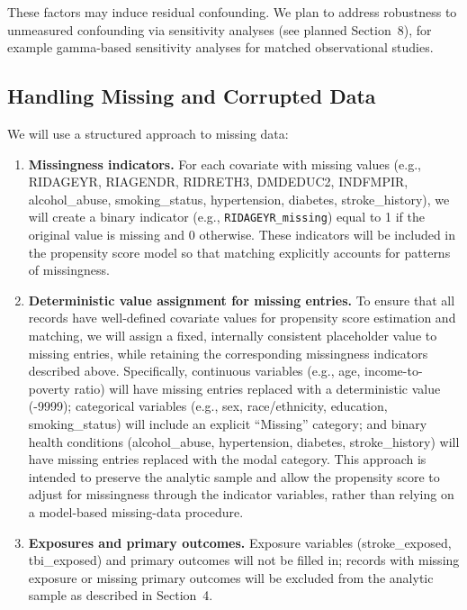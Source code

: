 \documentclass{article}
\begin{document}
These factors may induce residual confounding. We plan to address robustness to unmeasured confounding via sensitivity analyses (see planned Section~8), for example gamma-based sensitivity analyses for matched observational studies.

\subsection{Handling Missing and Corrupted Data}

We will use a structured approach to missing data:

\begin{enumerate}
    \item \textbf{Missingness indicators.} For each covariate with missing values (e.g., RIDAGEYR, RIAGENDR, RIDRETH3, DMDEDUC2, INDFMPIR, alcohol\_abuse, smoking\_status, hypertension, diabetes, stroke\_history), we will create a binary indicator (e.g., \texttt{RIDAGEYR\_missing}) equal to 1 if the original value is missing and 0 otherwise. These indicators will be included in the propensity score model so that matching explicitly accounts for patterns of missingness.

    \item \textbf{Deterministic value assignment for missing entries.} To ensure that all records have well-defined covariate values for propensity score estimation and matching, we will assign a fixed, internally consistent placeholder value to missing entries, while retaining the corresponding missingness indicators described above. Specifically, continuous variables (e.g., age, income-to-poverty ratio) will have missing entries replaced with a deterministic value (-9999); categorical variables (e.g., sex, race/ethnicity, education, smoking\_status) will include an explicit ``Missing'' category; and binary health conditions (alcohol\_abuse, hypertension, diabetes, stroke\_history) will have missing entries replaced with the modal category. This approach is intended to preserve the analytic sample and allow the propensity score to adjust for missingness through the indicator variables, rather than relying on a model-based missing-data procedure.

    \item \textbf{Exposures and primary outcomes.} Exposure variables (stroke\_exposed, tbi\_exposed) and primary outcomes will not be filled in; records with missing exposure or missing primary outcomes will be excluded from the analytic sample as described in Section~4.

\end{enumerate}
\end{document}
